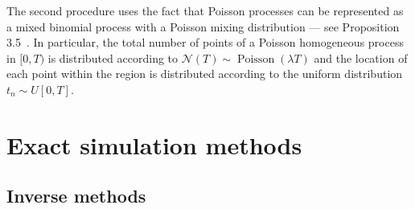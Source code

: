 \documentclass{juliacon}
\begin{document}
The second procedure uses the fact that Poisson processes can be represented as a mixed binomial process with a Poisson mixing distribution --- see Proposition 3.5~\cite{last2017}. In particular, the total number of points of a Poisson homogeneous process in \( [0, T) \) is distributed according to \( \mathcal{N} (T) \sim \operatorname{Poisson}( \lambda T ) \) and the location of each point within the region is distributed according to the uniform distribution \( t_n \sim U[0, T] \).




\section{Exact simulation methods} \label{sec:method-exact}

\subsection{Inverse methods} \label{subsec:sim-inverse}
\end{document}
